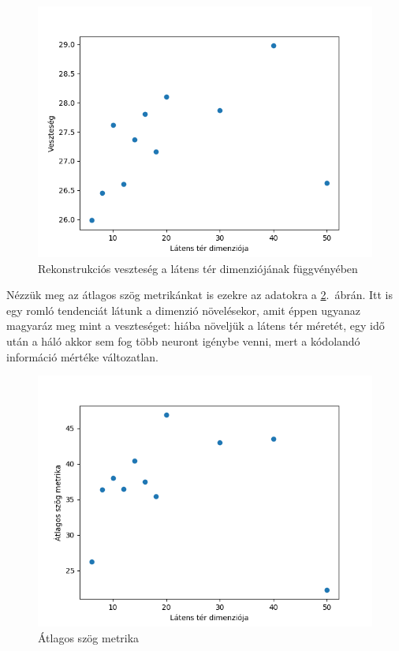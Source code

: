 \begin{figure}[h!]
\begin{center}
 
  \includegraphics[width=0.75\linewidth]{metrics/vae_ldim-loss.png}
  \caption{Rekonstrukciós veszteség a látens tér dimenziójának függvényében} \label{ldim-loss}
\end{center}
\end{figure}

Nézzük meg az átlagos szög metrikánkat is ezekre az adatokra a \ref{ldim-metrics}.~ábrán. Itt is egy romló tendenciát látunk a dimenzió növelésekor, amit éppen ugyanaz magyaráz meg mint a veszteséget: hiába növeljük a látens tér méretét, egy idő után a háló akkor sem fog több neuront igénybe venni, mert a kódolandó információ mértéke változatlan. 

\begin{figure}[h!]
\begin{center}
  
  \includegraphics[width=0.75\linewidth]{metrics/vae_ldim-as.png}
  \caption{Átlagos szög metrika}\label{ldim-metrics}
\end{center}
\end{figure}


